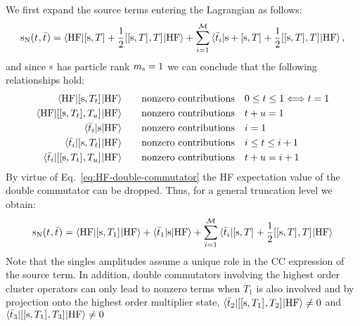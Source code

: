 We first expand the source terms entering the Lagrangian as follows:
\begin{equation}
  \mathrm{s}_{\mathrm{N}}(t_{}, \bar{t}_{}) =
  \braket{\mathrm{HF} | [ \mathrm{s}, T ]^{} + \frac{1}{2}[ [ \mathrm{s}, T ]^{}, T ]^{} | \mathrm{HF}}
  + \sum_{i=1}^{\mathcal{M}}\braket{\bar{t}_{i} | \mathrm{s} + [ \mathrm{s}, T ]^{} +
  \frac{1}{2}[ [ \mathrm{s}, T ]^{}, T ]^{} | \mathrm{HF}},
\end{equation}
and since $\mathrm{s}$ has particle rank $m_{\mathrm{s}} = 1$ we can conclude that the
following relationships hold:
\begin{subequations}
\begin{align}
  \braket{\mathrm{HF} |
  [ \mathrm{s}, T_t ]^{}
  | \mathrm{HF}}
  &\quad\quad\text{nonzero contributions} \quad 0 \leq t \leq 1
  \Longleftrightarrow t = 1 \\
  \braket{\mathrm{HF} |
  [ [ \mathrm{s}, T_t ]^{}, T_u ]^{}
  | \mathrm{HF}}
  &\quad\quad\text{nonzero contributions} \quad t + u = 1
  \label{eq:HF-double-commutator} \\
  \braket{\bar{t}_{i} |
  \mathrm{s}
  | \mathrm{HF} }
  &\quad\quad\text{nonzero contributions} \quad i = 1 \\
  \braket{\bar{t}_{i} |
  [ \mathrm{s}, T_t ]^{}
  | \mathrm{HF} }
  &\quad\quad\text{nonzero contributions} \quad i \leq t \leq i + 1 \\
  \braket{\bar{t}_{i} |
  [ [ \mathrm{s}, T_t ]^{}, T_u ]^{}
  | \mathrm{HF} }
  &\quad\quad\text{nonzero contributions} \quad t + u = i + 1
\end{align}
\end{subequations}
By virtue of Eq.~\eqref{eq:HF-double-commutator} the \acrshort{HF}
expectation value of the double commutator can be dropped. Thus, for a
general truncation level we obtain:
\begin{equation}\label{eq:source-term}
  \mathrm{s}_{\mathrm{N}}(t_{}, \bar{t}_{}) =
  \braket{\mathrm{HF} | [ \mathrm{s}, T_1 ]^{} | \mathrm{HF}}
  + \braket{\bar{t}_{1} | \mathrm{s} | \mathrm{HF}}
  + \sum_{i=1}^{\mathcal{M}}\braket{\bar{t}_{i} | [ \mathrm{s}, T ]^{} + \frac{1}{2}[ [ \mathrm{s}, T ]^{}, T ]^{} | \mathrm{HF}}
\end{equation}
Note that the singles amplitudes assume a unique role in the \acrshort{CC}
expression of the source term.
In addition, double commutators involving the highest order cluster
operators can only lead to nonzero terms when $T_1$ is also involved and
by projection onto the highest order multiplier state, \eg
$\braket{\bar{t}_{2} | [ [ \mathrm{s}, T_1 ]^{}, T_2 ]^{} |
\mathrm{HF}} \neq 0$ and $\braket{\bar{t}_{3} |
[ [ \mathrm{s}, T_1 ]^{}, T_3 ]^{} | \mathrm{HF}} \neq 0$
